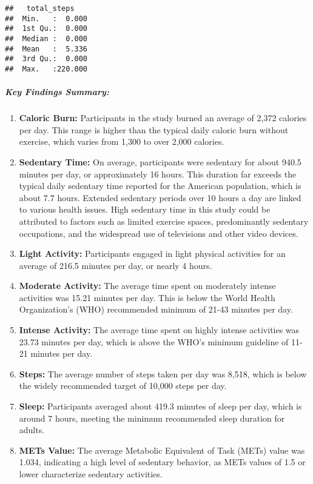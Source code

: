 \documentclass[
]{article}
\begin{document}
\begin{verbatim}
##   total_steps     
##  Min.   :  0.000  
##  1st Qu.:  0.000  
##  Median :  0.000  
##  Mean   :  5.336  
##  3rd Qu.:  0.000  
##  Max.   :220.000
\end{verbatim}

\hypertarget{key-findings-summary}{%
\subparagraph{Key Findings Summary:}\label{key-findings-summary}}

\begin{enumerate}
\def\labelenumi{\arabic{enumi}.}
\item
  \textbf{Caloric Burn:} Participants in the study burned an average of
  2,372 calories per day. This range is higher than the typical daily
  caloric burn without exercise, which varies from 1,300 to over 2,000
  calories.
\item
  \textbf{Sedentary Time:} On average, participants were sedentary for
  about 940.5 minutes per day, or approximately 16 hours. This duration
  far exceeds the typical daily sedentary time reported for the American
  population, which is about 7.7 hours. Extended sedentary periods over
  10 hours a day are linked to various health issues. High sedentary
  time in this study could be attributed to factors such as limited
  exercise spaces, predominantly sedentary occupations, and the
  widespread use of televisions and other video devices.
\item
  \textbf{Light Activity:} Participants engaged in light physical
  activities for an average of 216.5 minutes per day, or nearly 4 hours.
\item
  \textbf{Moderate Activity:} The average time spent on moderately
  intense activities was 15.21 minutes per day. This is below the World
  Health Organization's (WHO) recommended minimum of 21-43 minutes per
  day.
\item
  \textbf{Intense Activity:} The average time spent on highly intense
  activities was 23.73 minutes per day, which is above the WHO's minimum
  guideline of 11-21 minutes per day.
\item
  \textbf{Steps:} The average number of steps taken per day was 8,518,
  which is below the widely recommended target of 10,000 steps per day.
\item
  \textbf{Sleep:} Participants averaged about 419.3 minutes of sleep per
  day, which is around 7 hours, meeting the minimum recommended sleep
  duration for adults.
\item
  \textbf{METs Value:} The average Metabolic Equivalent of Task (METs)
  value was 1.034, indicating a high level of sedentary behavior, as
  METs values of 1.5 or lower characterize sedentary activities.
\end{enumerate}
\end{document}
